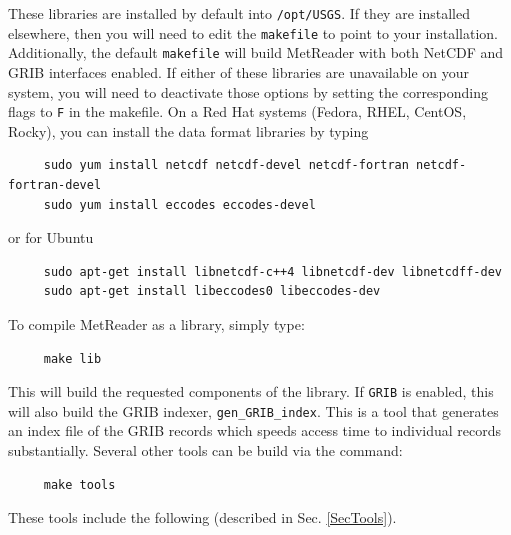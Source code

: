 \documentclass[11pt]{article}   %
\begin{document}
These libraries are installed by default into \texttt{/opt/USGS}.  If they are
installed elsewhere, then you will need to edit the \texttt{makefile}
to point to your installation.
Additionally, the default \texttt{makefile} will build MetReader with both NetCDF and GRIB
interfaces enabled.  If either of these libraries are unavailable on your system, you will need to
deactivate those options by setting the corresponding flags to \texttt{F} in the makefile.
On a Red Hat systems (Fedora, RHEL, CentOS, Rocky), you can install the data
format libraries by typing
\begin{verbatim}
     sudo yum install netcdf netcdf-devel netcdf-fortran netcdf-fortran-devel
     sudo yum install eccodes eccodes-devel
\end{verbatim}
or for Ubuntu
\begin{verbatim}
     sudo apt-get install libnetcdf-c++4 libnetcdf-dev libnetcdff-dev
     sudo apt-get install libeccodes0 libeccodes-dev
\end{verbatim}
To compile MetReader as a library, simply type:
\begin{verbatim}
     make lib
\end{verbatim}
This will build the requested components of the library.  If \texttt{GRIB} is enabled,
this will also build the GRIB indexer, \texttt{gen\_GRIB\_index}.
This is a tool that generates an index file of the GRIB records which speeds
access time to individual records substantially.
Several other tools can be build via the command:
\begin{verbatim}
     make tools
\end{verbatim}
These tools include the following (described in Sec. \ref{SecTools}).
\end{document}
